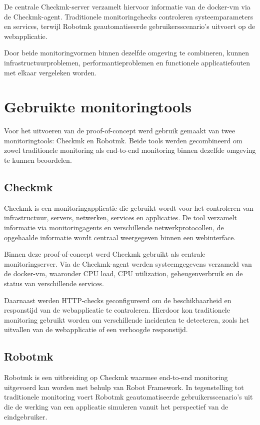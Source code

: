 De centrale Checkmk-server verzamelt hiervoor informatie van de docker-vm via de Checkmk-agent. Traditionele monitoringchecks controleren systeemparameters en services, terwijl Robotmk geautomatiseerde gebruikersscenario’s uitvoert op de webapplicatie.

Door beide monitoringvormen binnen dezelfde omgeving te combineren, kunnen infrastructuurproblemen, performantieproblemen en functionele applicatiefouten met elkaar vergeleken worden.

\section{Gebruikte monitoringtools}

Voor het uitvoeren van de proof-of-concept werd gebruik gemaakt van twee monitoringtools: Checkmk en Robotmk. Beide tools werden gecombineerd om zowel traditionele monitoring als end-to-end monitoring binnen dezelfde omgeving te kunnen beoordelen.

\subsection{Checkmk}

Checkmk is een monitoringapplicatie die gebruikt wordt voor het controleren van infrastructuur, servers, netwerken, services en applicaties. De tool verzamelt informatie via monitoringagents en verschillende netwerkprotocollen, de opgehaalde informatie wordt centraal  weergegeven binnen een webinterface.

Binnen deze proof-of-concept werd Checkmk gebruikt als centrale monitoringserver. Via de Checkmk-agent werden systeemgegevens verzameld van de docker-vm, waaronder CPU load, CPU utilization, geheugenverbruik en de status van verschillende services.

Daarnaast werden HTTP-checks geconfigureerd om de beschikbaarheid en responstijd van de webapplicatie te controleren. Hierdoor kon traditionele monitoring gebruikt worden om verschillende incidenten te detecteren, zoals het uitvallen van de webapplicatie of een verhoogde responstijd.


\subsection{Robotmk}

Robotmk is een uitbreiding op Checkmk waarmee end-to-end monitoring uitgevoerd kan worden met behulp van Robot Framework. In tegenstelling tot traditionele monitoring voert Robotmk geautomatiseerde gebruikersscenario’s uit die de werking van een applicatie simuleren vanuit het perspectief van de eindgebruiker.

